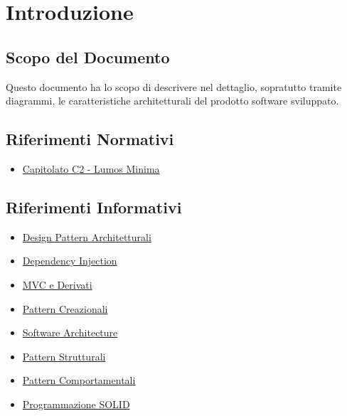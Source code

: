 \documentclass[a4paper, 11pt]{article}
\begin{document}
\makeindexdetails
\makefrontpage \makeversioni
\tableofcontents
\newpage
\listoffigures
\clearpage
{}
\newpage
\section{Introduzione}
\subsection{Scopo del Documento}
Questo documento ha lo scopo di descrivere nel dettaglio, sopratutto tramite diagrammi, le caratteristiche architetturali del prodotto software sviluppato.
\subsection{Riferimenti Normativi}
\begin{itemize}
    \item \href{https://www.math.unipd.it/~tullio/IS-1/2022/Progetto/C2.pdf}{Capitolato C2 - Lumos Minima}
\end{itemize}

\subsection{Riferimenti Informativi}
\begin{itemize}
    \item \href{https://www.math.unipd.it/~rcardin/swea/2022/Software%20Architecture%20Patterns.pdf}{Design Pattern Architetturali}
    \item \href{https://www.math.unipd.it/~rcardin/swea/2022/Design%20Pattern%20Architetturali%20-%20Dependency%20Injection.pdf}{Dependency Injection}
    \item \href{https://www.math.unipd.it/~rcardin/sweb/2022/L02.pdf}{MVC e Derivati}
    \item \href{https://www.math.unipd.it/~rcardin/swea/2022/Design%20Pattern%20Creazionali.pdf}{Pattern Creazionali}
    \item \href{http://www.math.unipd.it/~tullio/IS-1/2006/Approfondimenti/SEI-Software_Architectures.pdf}{Software Architecture}
    \item \href{https://www.math.unipd.it/~rcardin/swea/2022/Design%20Pattern%20Strutturali.pdf}{Pattern Strutturali}
    \item \href{https://www.math.unipd.it/~rcardin/swea/2021/Design%20Pattern%20Comportamentali_4x4.pdf}{Pattern Comportamentali}
    \item \href{https://www.math.unipd.it/~rcardin/swea/2021/SOLID%20Principles%20of%20Object-Oriented%20Design_4x4.pdf}{Programmazione SOLID}
\end{itemize}
\end{document}
